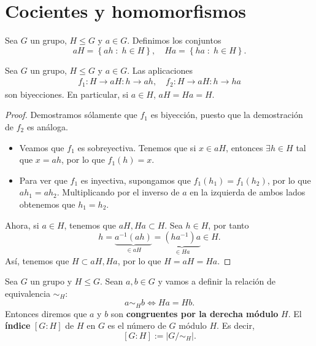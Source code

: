 \chapter{Cocientes y homomorfismos}
\begin{definition}
Sea $\displaystyle G $ un grupo, $\displaystyle H \leq G $ y $\displaystyle a \in G $. Definimos los conjuntos
\[aH = \left\{ ah \; : \; h \in H\right\} , \quad Ha = \left\{ ha \; : \; h \in H\right\}  .\]
\end{definition}
\begin{lema}
Sea $\displaystyle G $ un grupo, $\displaystyle H \leq G $ y $\displaystyle a \in G $. Las aplicaciones
\[
\begin{split}
f_{1} : H \to aH : h \to ah, \quad f_{2} : H \to aH : h \to ha 
\end{split}
\]
son biyecciones. En particular, si $\displaystyle a \in H $, $\displaystyle aH = Ha = H $.
\end{lema}
\begin{proof}
Demostramos sólamente que $\displaystyle f_{1} $ es biyección, puesto que la demostración de $\displaystyle f_{2} $ es análoga. 
\begin{itemize}
\item Veamos que $\displaystyle f_{1} $ es sobreyectiva. Tenemos que si $\displaystyle x \in aH $, entonces $\displaystyle \exists h \in H $ tal que $\displaystyle x = ah $, por lo que $\displaystyle f_{1}\left(h\right) = x $.
\item Para ver que $\displaystyle f_{1} $ es inyectiva, supongamos que $\displaystyle f_{1}\left(h_{1}\right) = f_{1}\left(h_{2}\right) $, por lo que $\displaystyle ah_{1} = ah_{2} $. Multiplicando por el inverso de  $\displaystyle a $ en la izquierda de ambos lados obtenemos que $\displaystyle h_{1} = h_{2} $.
\end{itemize}
Ahora, si $\displaystyle a \in H $, tenemos que $\displaystyle aH, Ha \subset H $. Sea $\displaystyle h \in H $, por tanto
\[h =\underbrace{ a^{-1}\left(ah\right)}_{\in aH} = \underbrace{\left(ha^{-1}\right)a}_{\in Ha} \in H .\]
Así, tenemos que $\displaystyle H \subset aH,Ha $, por lo que $\displaystyle H = aH = Ha $.
\end{proof}
\begin{definition}
Sea $\displaystyle G $ un grupo y $\displaystyle H \leq G $. Sean $\displaystyle a,b \in G $ y vamos a definir la relación de equivalencia $\displaystyle \sim_{H} $:
\[a\sim_{H} b \iff Ha = Hb .\]
Entonces diremos que $\displaystyle a $ y $\displaystyle b $ son \textbf{congruentes por la derecha módulo} $\displaystyle H $. El \textbf{índice} $\displaystyle [G:H] $ de $\displaystyle H $ en $\displaystyle G $ es el número de $\displaystyle G $ módulo $\displaystyle H $. Es decir, 
\[ [G : H] := \left|G/\sim_{H}\right| .\]
\end{definition}
